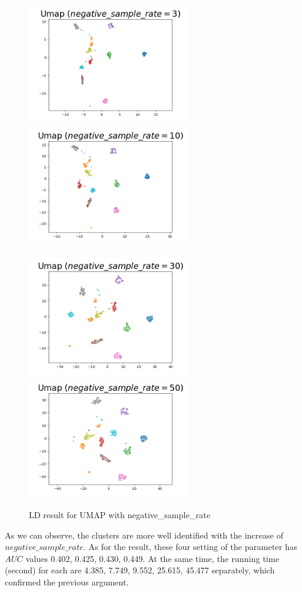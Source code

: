 \begin{figure}[H]
\centering  %
{
\label{Fig.sub.1}
\includegraphics[width=7cm,height=3.5cm\textwidth]{images/umap/umap_neg_3.png}}
{
\label{Fig.sub.2}
\includegraphics[width=7cm,height=3.5cm\textwidth]{images/umap/umap_neg_10.png}}

\centering  %
{
\label{Fig.sub.1}
\includegraphics[width=7cm,height=3.5cm\textwidth]{images/umap/umap_neg_30.png}}
{
\label{Fig.sub.2}
\includegraphics[width=7cm,height=3.5cm\textwidth]{images/umap/umap_neg_50.png}}
\caption{LD result for UMAP with negative\_sample\_rate}
\end{figure}

\noindent As we can observe, the clusters are more well identified with the increase of $negative\_sample\_rate$. As for the result, these four setting of the parameter has $AUC$ values 0.402, 0.425,  0.430, 0.449. At the same time, the running time (second) for each are 4.385, 7.749, 9.552,  25.615,  45.477 separately, which confirmed the previous argument.\\

